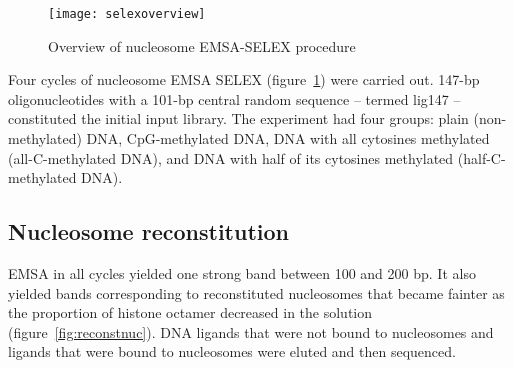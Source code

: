 \documentclass[parskip=full, numbers=noenddot]{scrreprt}
\begin{document}
\begin{figure}[htpb]
  \centering
  \texttt{[image: selexoverview]}
  \caption{Overview of nucleosome EMSA-SELEX procedure}
  \label{fig:selex}
\end{figure}

Four cycles of nucleosome EMSA SELEX (figure~\ref{fig:selex}) were carried out.  147-bp oligonucleotides with a 101-bp central random sequence -- termed lig147 \citep{zhu_interaction_2018} -- constituted the initial input library.  The experiment had four groups: plain (non-methylated) DNA, CpG-methylated DNA, DNA with all cytosines methylated (all-C-methylated DNA), and DNA with half of its cytosines methylated (half-C-methylated DNA).

\subsection{Nucleosome reconstitution}
\label{ssec:reconstnuc}

EMSA in all cycles yielded one strong band between 100 and 200 bp. It also yielded bands corresponding to reconstituted nucleosomes that became fainter as the proportion of histone octamer decreased in the solution (figure~\ref{fig:reconstnuc}).  DNA ligands that were not bound to nucleosomes and ligands that were bound to nucleosomes were eluted and then sequenced.
\end{document}
